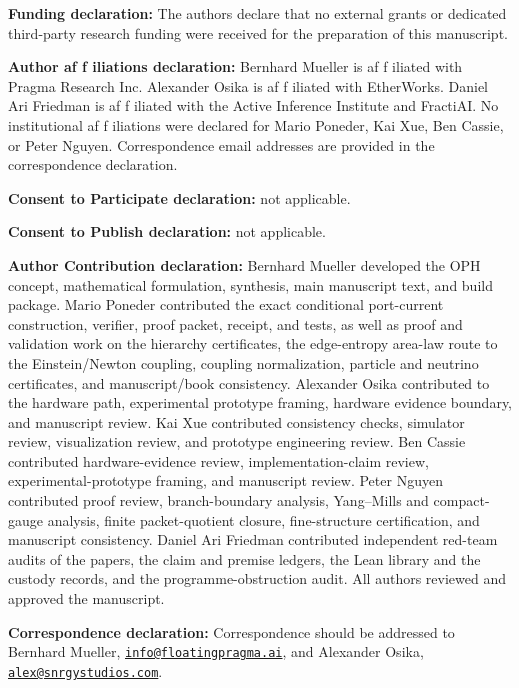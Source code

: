 \documentclass[11pt]{article}
\begin{document}
\noindent\textbf{Funding declaration:} The authors declare that no external grants or dedicated
third-party research funding were received for the preparation of this manuscript.

\noindent\textbf{Author af\kern0pt f\kern0pt iliations declaration:} Bernhard Mueller is af\kern0pt f\kern0pt iliated with
Pragma Research Inc. Alexander Osika is af\kern0pt f\kern0pt iliated with EtherWorks. Daniel Ari Friedman is af\kern0pt f\kern0pt iliated with the Active Inference Institute and FractiAI. No institutional af\kern0pt f\kern0pt iliations were declared for Mario Poneder, Kai
Xue, Ben Cassie, or Peter Nguyen.
Correspondence email addresses are provided in the correspondence declaration.

\noindent\textbf{Consent to Participate declaration:} not applicable.

\noindent\textbf{Consent to Publish declaration:} not applicable.

\noindent\textbf{Author Contribution declaration:} Bernhard Mueller developed the OPH concept,
mathematical formulation, synthesis, main manuscript text, and build package. Mario Poneder
contributed the exact conditional port-current construction, verifier, proof packet, receipt, and
tests, as well as proof and validation work on the hierarchy certificates, the edge-entropy
area-law route to the Einstein/Newton coupling, coupling normalization, particle and neutrino
certificates, and manuscript/book consistency. Alexander Osika contributed to the hardware path, experimental prototype framing, hardware evidence boundary, and manuscript review. Kai Xue contributed consistency
checks, simulator review, visualization review, and prototype engineering
review. Ben Cassie contributed hardware-evidence review, implementation-claim
review, experimental-prototype framing, and manuscript review. Peter
Nguyen contributed proof review, branch-boundary analysis, Yang--Mills and
compact-gauge analysis, finite packet-quotient closure, fine-structure
certification, and manuscript consistency. Daniel Ari Friedman contributed
independent red-team audits of the papers, the claim and premise ledgers, the
Lean library and the custody records, and the programme-obstruction audit.
All authors reviewed and approved the manuscript.

\noindent\textbf{Correspondence declaration:} Correspondence should be addressed to Bernhard
Mueller, \href{mailto:info@floatingpragma.ai}{\texttt{info@floatingpragma.ai}}, and
Alexander Osika, \href{mailto:alex@snrgystudios.com}{\texttt{alex@snrgystudios.com}}.
\end{document}
